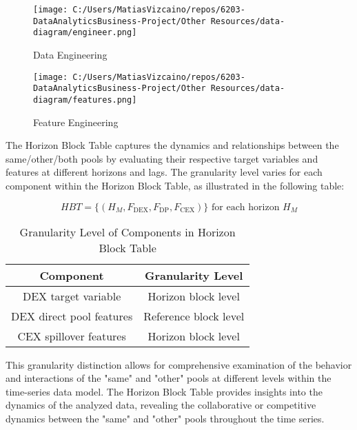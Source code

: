 \documentclass{article}
\begin{document}
\begin{figure}[htbp]
\begin{minipage}{0.5\textwidth}
\centering
\texttt{[image: C:/Users/MatiasVizcaino/repos/6203-DataAnalyticsBusiness-Project/Other Resources/data-diagram/engineer.png]}
\caption{Data Engineering}
\label{fig:data-diagram-engineer}
\end{minipage}
\begin{minipage}{0.45\textwidth}
\centering
\texttt{[image: C:/Users/MatiasVizcaino/repos/6203-DataAnalyticsBusiness-Project/Other Resources/data-diagram/features.png]}
\caption{Feature Engineering}
\label{fig:data-diagram-features}
\end{minipage}
\end{figure}

The Horizon Block Table captures the dynamics and relationships between the same/other/both pools by evaluating their respective target variables and features at different horizons and lags. The granularity level varies for each component within the Horizon Block Table, as illustrated in the following table:

\begin{equation}
HBT = \{ (H_{M}, F_{\text{DEX}}, F_{\text{DP}}, F_{\text{CEX}}) \} \text{ for each horizon } H_{M} 
\end{equation}

\begin{table}[htbp]
\centering
\begin{tabular}{|c|c|}
\hline
\textbf{Component} & \textbf{Granularity Level} \\
\hline
DEX target variable & Horizon block level \\
\hline
DEX direct pool features & Reference block level \\
\hline
CEX spillover features & Horizon block level \\
\hline
\end{tabular}
\caption{Granularity Level of Components in Horizon Block Table}
\label{table:granularity}
\end{table}

This granularity distinction allows for comprehensive examination of the behavior and interactions of the "same" and "other" pools at different levels within the time-series data model. The Horizon Block Table provides insights into the dynamics of the analyzed data, revealing the collaborative or competitive dynamics between the "same" and "other" pools throughout the time series.
\end{document}
